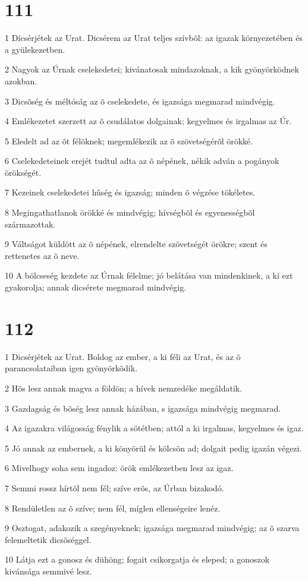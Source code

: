 \chapter{111}

\par 1 Dícsérjétek az Urat. Dicsérem az Urat teljes szívbõl: az igazak környezetében és a gyülekezetben.
\par 2 Nagyok az Úrnak cselekedetei; kivánatosak mindazoknak, a kik gyönyörködnek azokban.
\par 3 Dicsõség és méltóság az õ cselekedete, és igazsága megmarad mindvégig.
\par 4 Emlékezetet szerzett az õ csudálatos dolgainak; kegyelmes és irgalmas az Úr.
\par 5 Eledelt ad az õt félõknek; megemlékezik az õ szövetségérõl örökké.
\par 6 Cselekedeteinek erejét tudtul adta az õ népének, nékik adván a pogányok örökségét.
\par 7 Kezeinek cselekedetei hûség és igazság; minden õ végzése tökéletes.
\par 8 Megingathatlanok örökké és mindvégig; hívségbõl és egyenességbõl származottak.
\par 9 Váltságot küldött az õ népének, elrendelte szövetségét örökre; szent és rettenetes az õ neve.
\par 10 A bölcseség kezdete az Úrnak félelme; jó belátása van mindenkinek, a ki ezt gyakorolja; annak dicsérete megmarad mindvégig.

\chapter{112}

\par 1 Dicsérjétek az Urat. Boldog az ember, a ki féli az Urat, és az õ parancsolataiban igen gyönyörködik.
\par 2 Hõs lesz annak magva a földön; a hívek nemzedéke megáldatik.
\par 3 Gazdagság és bõség lesz annak házában, s igazsága mindvégig megmarad.
\par 4 Az igazakra világosság fénylik a sötétben; attól a ki irgalmas, kegyelmes és igaz.
\par 5 Jó annak az embernek, a ki könyörül és kölcsön ad; dolgait pedig igazán végezi.
\par 6 Mivelhogy soha sem ingadoz: örök emlékezetben lesz az igaz.
\par 7 Semmi rossz hírtõl nem fél; szíve erõs, az Úrban bizakodó.
\par 8 Rendületlen az õ szíve; nem fél, míglen ellenségeire lenéz.
\par 9 Osztogat, adakozik a szegényeknek; igazsága megmarad mindvégig; az õ szarva felemeltetik dicsõséggel.
\par 10 Látja ezt a gonosz és dühöng; fogait csikorgatja és eleped; a gonoszok kivánsága semmivé lesz.

